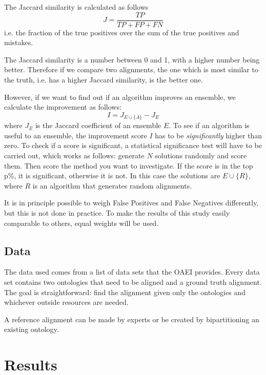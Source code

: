 \documentclass{article}
\begin{document}
 The Jaccard similarity is calculated as follows
 \[
 J = \frac{TP}{TP + FP + FN}
 \]
 i.e. the fraction of the true positives over the sum of the true positives and mistakes.
 
 The Jaccard similarity is a number between 0 and 1, with a higher number being better. Therefore if we compare two alignments, the one which is most similar to the truth, i.e. has a higher Jaccard similarity, is the better one.
 
 However, if we want to find out if an algorithm improves an ensemble, we calculate the improvement as follows:
 \[
 I = J_{E\cup \{A\}} - J_E
 \]
 where $J_E$ is the Jaccard coefficient of an ensemble $E$.
 To see if an algorithm is useful to an ensemble, the improvement score $I$ has to be \emph{significantly} higher than zero. To check if a score is significant, a statistical significance test will have to be carried out, which works as follows: generate $N$ solutions randomly and score them. Then score the method you want to investigate. If the score is in the top p\%, it is significant, otherwise it is not. In this case the solutions are $E\cup \{R\}$, where $R$ is an algorithm that generates random alignments. %
 
 It is in principle possible to weigh False Positives and False Negatives differently, but this is not done in practice. To make the results of this study easily comparable to others, equal weights will be used.
 \subsection{Data}
 The data used comes from a list of data sets that the OAEI provides. %
 Every data set contains two ontologies that need to be aligned and a ground truth alignment. The goal is straightforward: find the alignment given only the ontologies and whichever outside resources are needed.

 A reference alignment can be made by experts or be created by bipartitioning an existing ontology. %
 
 \newpage
 \section{Results} \label{results}
 
\end{document}
